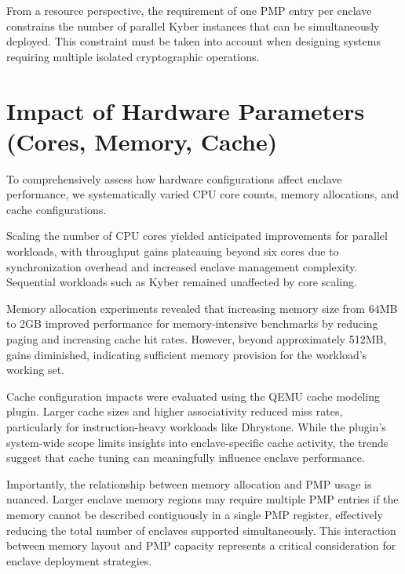From a resource perspective, the requirement of one PMP entry per enclave constrains the number of parallel Kyber instances that can be simultaneously deployed. This constraint must be taken into account when designing systems requiring multiple isolated cryptographic operations.

\section{Impact of Hardware Parameters (Cores, Memory, Cache)}

To comprehensively assess how hardware configurations affect enclave performance, we systematically varied CPU core counts, memory allocations, and cache configurations.

Scaling the number of CPU cores yielded anticipated improvements for parallel workloads, with throughput gains plateauing beyond six cores due to synchronization overhead and increased enclave management complexity. Sequential workloads such as Kyber remained unaffected by core scaling.

Memory allocation experiments revealed that increasing memory size from 64MB to 2GB improved performance for memory-intensive benchmarks by reducing paging and increasing cache hit rates. However, beyond approximately 512MB, gains diminished, indicating sufficient memory provision for the workload’s working set.

Cache configuration impacts were evaluated using the QEMU cache modeling plugin. Larger cache sizes and higher associativity reduced miss rates, particularly for instruction-heavy workloads like Dhrystone. While the plugin’s system-wide scope limits insights into enclave-specific cache activity, the trends suggest that cache tuning can meaningfully influence enclave performance.

Importantly, the relationship between memory allocation and PMP usage is nuanced. Larger enclave memory regions may require multiple PMP entries if the memory cannot be described contiguously in a single PMP register, effectively reducing the total number of enclaves supported simultaneously. This interaction between memory layout and PMP capacity represents a critical consideration for enclave deployment strategies.
